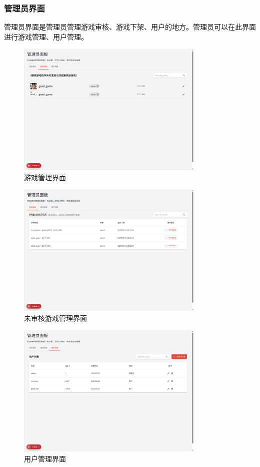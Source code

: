 \documentclass[12pt]{ctexart} %
\begin{document}
\subsubsection{管理员界面}
 管理员界面是管理员管理游戏审核、游戏下架、用户的地方。管理员可以在此界面进行游戏管理、用户管理。
\begin{figure}[H]
  \centering 
  \includegraphics[width=0.8\textwidth]{managergame.png}
  \caption{游戏管理界面}
\end{figure}
\begin{figure}[H]
  \centering 
  \includegraphics[width=0.8\textwidth]{managerunadited.png}
  \caption{未审核游戏管理界面}
\end{figure}
\begin{figure}[H]
  \centering 
  \includegraphics[width=0.8\textwidth]{manageruser.png}
  \caption{用户管理界面}
\end{figure}
\end{document}
